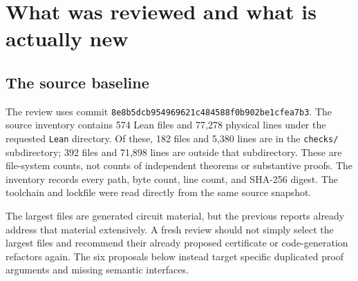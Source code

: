 \documentclass[11pt]{article}
\theoremstyle{remark}\newtheorem{remark}[theorem]{Remark}
\newcommand{\code}[1]{\nolinkurl{#1}}
\newcommand{\pin}{\code{8e8b5dcb954969621c484588f0b902be1cfea7b3}}
\begin{document}
\begin{abstract}
This report proposes six directions that were not found in the audited proof-simplification packets. It deliberately excludes their existing recommendations about list lookup, assignment naturality, shared sum-of-squares proofs, generated power certificates, scanner abstractions, polynomial degree, coefficient bounds, and general proof engineering. The new directions are: a single exact graph theorem for the syntax decoder; congruence modulo a sign for Pell proofs; constructor views combined with one internal unique-existence induction; invariant preservation and fusion for definable internal recursion; compositional certificates for representation depth; and an explicit classification of cyclic carries. The first is accompanied by an applicable production patch with an 18-line local reduction. Standalone Lean prototypes check the main abstract mechanisms. The cyclic-carry direction includes a general ordinary mathematical proof and 57,540 finite raw-array/budget checks. These are proposals for integration, not a claim that the full project has been rebuilt or that all suggested replacements already compile in their production modules.
\end{abstract}

\tableofcontents
\newpage

\section{What was reviewed and what is actually new}

\subsection{The source baseline}

The review uses commit \pin. The source inventory contains 574 Lean files and 77,278 physical lines under the requested \code{Lean} directory. Of these, 182 files and 5,380 lines are in the \code{checks/} subdirectory; 392 files and 71,898 lines are outside that subdirectory. These are file-system counts, not counts of independent theorems or substantive proofs. The inventory records every path, byte count, line count, and SHA-256 digest. The toolchain and lockfile were read directly from the same source snapshot.

The largest files are generated circuit material, but the previous reports already address that material extensively. A fresh review should not simply select the largest files and recommend their already proposed certificate or code-generation refactors again. The six proposals below instead target specific duplicated proof arguments and missing semantic interfaces.
\end{document}
